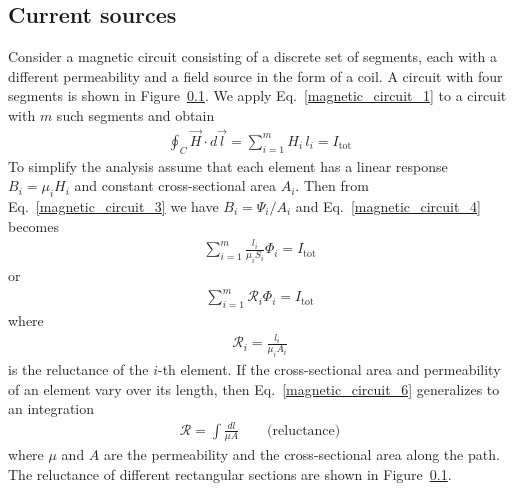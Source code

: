 \documentclass[12pt,a4paper,oneside]{book}
\begin{document}
\begin{onehalfspace}
\subsection{Current sources}
Consider a magnetic circuit consisting of a discrete set of segments, each with a different permeability and a field source in the form of a coil. A circuit with four segments is shown in Figure~\ref{}. We apply Eq.~\eqref{magnetic_circuit_1} to a circuit with $m$ such segments and obtain
\begin{equation}\label{magnetic_circuit_4}
	{\begin{aligned}
			\oint_{C} \vec{H}\cdot d\vec{l} = \sum_{i=1}^{m} H_i\,l_i = I_\text{tot}
	\end{aligned}}
\end{equation} 
To simplify the analysis assume that each element has a linear response $B_i=\mu_iH_i$ and constant cross-sectional area $A_i$. Then from Eq.~\eqref{magnetic_circuit_3} we have $B_i=\Psi_i/A_i$ and Eq.~\eqref{magnetic_circuit_4} becomes
\begin{equation}\label{magnetic_circuit_5}
	{\begin{aligned}
			\sum_{i=1}^{m}\frac{l_i}{\mu_iS_i}\Phi_i = I_\text{tot}
	\end{aligned}}
\end{equation} 
or
\begin{equation*}\label{}
{\begin{aligned}
		\sum_{i=1}^{m}\mathscr{R}_i\Phi_i = I_\text{tot}
\end{aligned}}
\end{equation*} 
where
\begin{equation}\label{magnetic_circuit_6}
{\begin{aligned}
		\mathscr{R}_i=\frac{l_i}{\mu_i A_i}
\end{aligned}}
\end{equation} 
is the reluctance of the $i$-th element. If the cross-sectional area and permeability of an element vary over its length, then Eq.~\eqref{magnetic_circuit_6} generalizes to an integration
\begin{equation*}\label{}
	{\begin{aligned}
			\mathscr{R}=\int\frac{dl}{\mu A}\qquad\text{(reluctance)}
	\end{aligned}}
\end{equation*} 
where $\mu$ and $A$ are the permeability and the cross-sectional area along the path. The reluctance of different rectangular sections are shown in Figure~\ref{}.


\end{onehalfspace}
\end{document}
